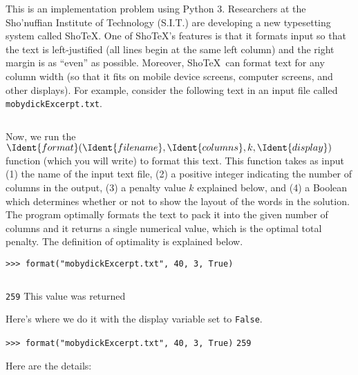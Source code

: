 \documentclass{ks-pset}
\begin{document}
\begin{problem}

  This is an implementation problem using Python 3.  Researchers at the
  Sho'nuffian Institute of Technology (S.I.T.) are developing a new typesetting
  system called Sho\TeX.  One of Sho\TeX's features is that it formats input so
  that the text is  left-justified (all lines begin at the same left column)
  and the right margin is as ``even'' as possible. Moreover, Sho\TeX\ can
  format text for any column width (so that it fits on mobile device screens,
  computer screens, and other displays).  For example, consider the following
  text in an input file called \verb+mobydickExcerpt.txt+.

  \begin{aside}
    \inputminted{text}{./template/mobydickExcerpt.txt}
  \end{aside}

  Now, we run the \(\Ident{format}(\Ident{filename}, \Ident{columns}, k,
  \Ident{display})\) function (which you will write) to format this text. This
  function takes as input (1) the name of the input text file, (2) a positive
  integer indicating the number of columns in the output, (3) a penalty value
  \(k\) explained below, and (4) a Boolean  which determines
  whether or not to show the layout of the words in the solution. The program
  optimally formats the text to pack it into the given number of columns and it
  returns a single numerical value, which is the optimal total penalty.  The
  definition of optimality is explained below.

  \begin{aside}
    \texttt{>>> format("mobydickExcerpt.txt", 40, 3, True)}
    \tcblower
    \inputminted{text}{template/mobydick-example.txt}
    \texttt{259} \quad\textleftarrow{} This value was returned
  \end{aside}

  Here's where we do it with the display variable set to \verb+False+.

  \begin{aside}
    \texttt{>>> format("mobydickExcerpt.txt", 40, 3, True)}
    \tcblower
    \texttt{259}
  \end{aside}

  Here are the details:


\end{problem}
\end{document}
